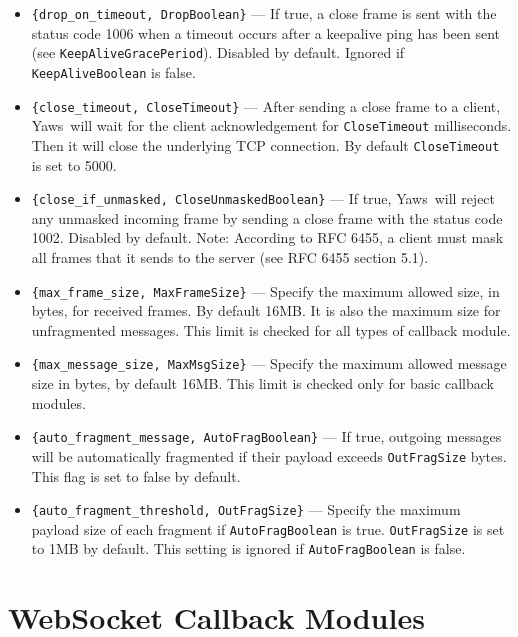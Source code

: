 \documentclass[11pt,oneside,english]{book}
\newcommand{\Yaws}            %
        {{\sc Yaws}}
\begin{document}
\begin{itemize}
    \item \verb+{drop_on_timeout, DropBoolean}+ ---
      If true, a close frame is sent with the status code 1006 when a timeout
      occurs after a keepalive ping has been sent (see
      \verb+KeepAliveGracePeriod+). Disabled by default. Ignored if
      \verb+KeepAliveBoolean+ is false.

    \item \verb+{close_timeout, CloseTimeout}+ ---
      After sending a close frame to a client, \Yaws\ will wait for the client
      acknowledgement for \verb+CloseTimeout+ milliseconds. Then it will
      close the underlying TCP connection. By default \verb+CloseTimeout+ is set
      to 5000.

    \item \verb+{close_if_unmasked, CloseUnmaskedBoolean}+ ---
      If true, \Yaws\ will reject any unmasked incoming frame by sending a close
      frame with the status code 1002. Disabled by default. Note: According to
      RFC 6455, a client must mask all frames that it sends to the server (see
      RFC 6455 section 5.1).

    \item \verb+{max_frame_size, MaxFrameSize}+ ---
      Specify the maximum allowed size, in bytes, for received frames. By
      default 16MB. It is also the maximum size for unfragmented
      messages. This limit is checked for all types of callback module.

    \item \verb+{max_message_size, MaxMsgSize}+ ---
      Specify the maximum allowed message size in bytes, by default 16MB. This
      limit is checked only for basic callback modules.

    \item \verb+{auto_fragment_message, AutoFragBoolean}+ ---
      If true, outgoing messages will be automatically fragmented if their
      payload exceeds \verb+OutFragSize+ bytes. This flag is set to false by
      default.

    \item \verb+{auto_fragment_threshold, OutFragSize}+ ---
      Specify the maximum payload size of each fragment if
      \verb+AutoFragBoolean+ is true. \verb+OutFragSize+ is set to 1MB by
      default. This setting is ignored if \verb+AutoFragBoolean+ is false.
\end{itemize}

\section{WebSocket Callback Modules}
\end{document}
